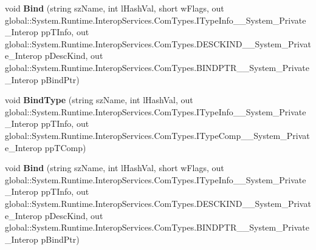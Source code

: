 \begin{DoxyCompactItemize}
\item 
\mbox{\label{interface_system_1_1_runtime_1_1_interop_services_1_1_com_types_1_1_i_type_comp_____system___private___interop_a18710cd4245d22d84924e20843c1a5b4}} 
void {\bfseries Bind} (string sz\+Name, int l\+Hash\+Val, short w\+Flags, out global\+::\+System.\+Runtime.\+Interop\+Services.\+Com\+Types.\+I\+Type\+Info\+\_\+\+\_\+\+System\+\_\+\+Private\+\_\+\+Interop pp\+T\+Info, out global\+::\+System.\+Runtime.\+Interop\+Services.\+Com\+Types.\+D\+E\+S\+C\+K\+I\+N\+D\+\_\+\+\_\+\+System\+\_\+\+Private\+\_\+\+Interop p\+Desc\+Kind, out global\+::\+System.\+Runtime.\+Interop\+Services.\+Com\+Types.\+B\+I\+N\+D\+P\+T\+R\+\_\+\+\_\+\+System\+\_\+\+Private\+\_\+\+Interop p\+Bind\+Ptr)
\item 
\mbox{\label{interface_system_1_1_runtime_1_1_interop_services_1_1_com_types_1_1_i_type_comp_____system___private___interop_ae21c9bf57bcae58539d1325a4f854d27}} 
void {\bfseries Bind\+Type} (string sz\+Name, int l\+Hash\+Val, out global\+::\+System.\+Runtime.\+Interop\+Services.\+Com\+Types.\+I\+Type\+Info\+\_\+\+\_\+\+System\+\_\+\+Private\+\_\+\+Interop pp\+T\+Info, out global\+::\+System.\+Runtime.\+Interop\+Services.\+Com\+Types.\+I\+Type\+Comp\+\_\+\+\_\+\+System\+\_\+\+Private\+\_\+\+Interop pp\+T\+Comp)
\item 
\mbox{\label{interface_system_1_1_runtime_1_1_interop_services_1_1_com_types_1_1_i_type_comp_____system___private___interop_a18710cd4245d22d84924e20843c1a5b4}} 
void {\bfseries Bind} (string sz\+Name, int l\+Hash\+Val, short w\+Flags, out global\+::\+System.\+Runtime.\+Interop\+Services.\+Com\+Types.\+I\+Type\+Info\+\_\+\+\_\+\+System\+\_\+\+Private\+\_\+\+Interop pp\+T\+Info, out global\+::\+System.\+Runtime.\+Interop\+Services.\+Com\+Types.\+D\+E\+S\+C\+K\+I\+N\+D\+\_\+\+\_\+\+System\+\_\+\+Private\+\_\+\+Interop p\+Desc\+Kind, out global\+::\+System.\+Runtime.\+Interop\+Services.\+Com\+Types.\+B\+I\+N\+D\+P\+T\+R\+\_\+\+\_\+\+System\+\_\+\+Private\+\_\+\+Interop p\+Bind\+Ptr)
\item 

\end{DoxyCompactItemize}

